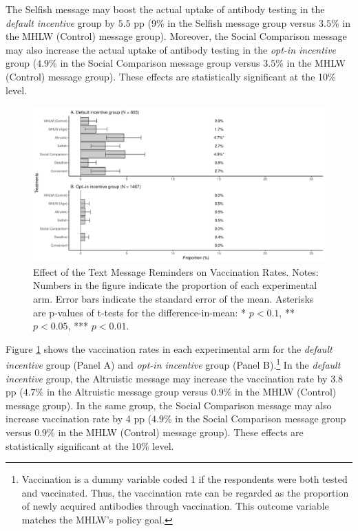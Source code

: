 \documentclass[
]{article}
\begin{document}
The Selfish message may boost the actual uptake of antibody testing in the \emph{default incentive} group by \(5.5\) pp (9\% in the Selfish message group versus \(3.5\)\% in the MHLW (Control) message group). Moreover, the Social Comparison message may also increase the actual uptake of antibody testing in the \emph{opt-in incentive} group (\(4.9\)\% in the Social Comparison message group versus \(3.5\)\% in the MHLW (Control) message group). These effects are statistically significant at the 10\% level.

\begin{figure}[t]
\includegraphics{discussion-paper_files/figure-latex/ttest-act-vacc-1} \caption{Effect of the Text Message Reminders on Vaccination Rates. Notes: Numbers in the figure indicate the proportion of each experimental arm. Error bars indicate the standard error of the mean. Asterisks are p-values of t-tests for the difference-in-mean: * $p < 0.1$, ** $p < 0.05$, *** $p < 0.01$.}\label{fig:ttest-act-vacc}
\end{figure}

Figure \ref{fig:ttest-act-vacc} shows the vaccination rates in each experimental arm for the \emph{default incentive} group (Panel A) and \emph{opt-in incentive} group (Panel B).\footnote{Vaccination is a dummy variable coded 1 if the respondents were both tested and vaccinated. Thus, the vaccination rate can be regarded as the proportion of newly acquired antibodies through vaccination. This outcome variable matches the MHLW's policy goal.} In the \emph{default incentive} group, the Altruistic message may increase the vaccination rate by \(3.8\) pp (\(4.7\)\% in the Altruistic message group versus \(0.9\)\% in the MHLW (Control) message group). In the same group, the Social Comparison message may also increase vaccination rate by 4 pp (\(4.9\)\% in the Social Comparison message group versus \(0.9\)\% in the MHLW (Control) message group). These effects are statistically significant at the 10\% level.
\end{document}
